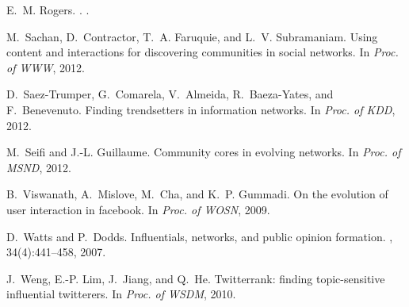 \documentclass[letterpaper]{www13-companion-accepted}
\begin{document}
{\begin{thebibliography}{10}
E.~M. Rogers.
.
.

M.~Sachan, D.~Contractor, T.~A. Faruquie, and L.~V. Subramaniam.
\newblock Using content and interactions for discovering communities in social
  networks.
\newblock In {\em Proc. of WWW}, 2012.

D.~Saez-Trumper, G.~Comarela, V.~Almeida, R.~Baeza-Yates, and F.~Benevenuto.
\newblock Finding trendsetters in information networks.
\newblock In {\em Proc. of KDD}, 2012.

M.~Seifi and J.-L. Guillaume.
\newblock Community cores in evolving networks.
\newblock In {\em Proc. of MSND}, 2012.

B.~Viswanath, A.~Mislove, M.~Cha, and K.~P. Gummadi.
\newblock On the evolution of user interaction in facebook.
\newblock In {\em Proc. of WOSN}, 2009.

D.~Watts and P.~Dodds.
\newblock Influentials, networks, and public opinion formation.
, 34(4):441--458, 2007.

J.~Weng, E.-P. Lim, J.~Jiang, and Q.~He.
\newblock Twitterrank: finding topic-sensitive influential twitterers.
\newblock In {\em Proc. of WSDM}, 2010.

\end{thebibliography}


}
\end{document}
